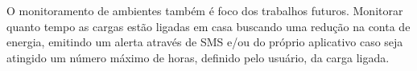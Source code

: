 \documentclass[
12pt,
openany, %
oneside, %
a4paper,			
english,			
brazil			        %
]{abntbibufjf}
\begin{document}
	 O monitoramento de ambientes também é foco dos trabalhos futuros. Monitorar quanto tempo as cargas estão ligadas em casa buscando uma redução na conta de energia, emitindo um alerta através de SMS e/ou do próprio aplicativo caso seja atingido um número máximo de horas, definido pelo usuário, da carga ligada.
	



	
	
	\postextual
	
    
	
    
    

\end{document}
